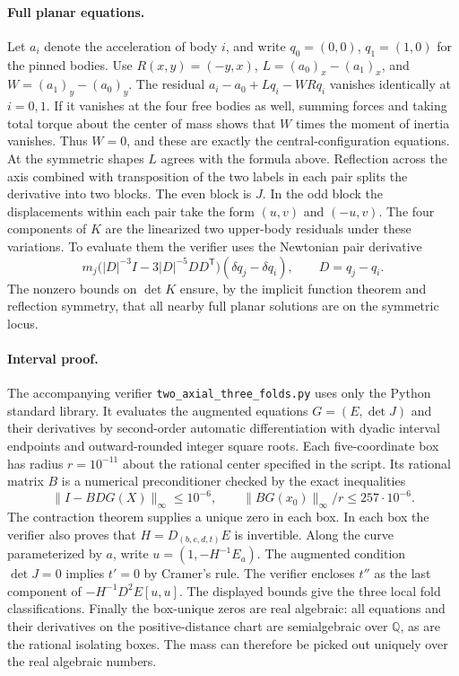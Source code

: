 \documentclass[11pt]{article}
\begin{document}
\paragraph{Full planar equations.}
Let $a_i$ denote the acceleration of body $i$, and write $q_0=(0,0)$,
$q_1=(1,0)$ for the pinned bodies. Use $R(x,y)=(-y,x)$,
$L=(a_0)_x-(a_1)_x$, and $W=(a_1)_y-(a_0)_y$. The residual
$a_i-a_0+Lq_i-WRq_i$ vanishes identically at $i=0,1$. If it vanishes
at the four free bodies as well, summing forces and taking total torque
about the center of mass shows that $W$ times the moment of inertia
vanishes. Thus $W=0$, and these are exactly the central-configuration
equations. At the symmetric shapes $L$ agrees with the formula above.
Reflection across the axis combined with transposition of the two labels
in each pair splits the derivative into two blocks. The even block is $J$.
In the odd block the displacements within each pair take the form
$(u,v)$ and $(-u,v)$. The four components of $K$ are the linearized
two upper-body residuals under these variations. To evaluate them the
verifier uses the Newtonian pair derivative
\[
 m_j\bigl(|D|^{-3}I-3|D|^{-5}DD^{\mathsf T}\bigr)
 (\delta q_j-\delta q_i),\qquad D=q_j-q_i.
\]
The nonzero bounds on $\det K$ ensure, by the implicit function theorem
and reflection symmetry, that all nearby full planar solutions are on
the symmetric locus.

\paragraph{Interval proof.}
The accompanying verifier \texttt{two\_axial\_three\_folds.py} uses only the
Python standard library. It evaluates the augmented equations
$G=(E,\det J)$ and their derivatives by second-order automatic
differentiation with dyadic interval endpoints and outward-rounded integer
square roots. Each five-coordinate box has radius $r=10^{-11}$ about the
rational center specified in the script. Its rational matrix $B$ is a
numerical preconditioner checked by the exact inequalities
\[
 \|I-BDG(X)\|_\infty\leq 10^{-6},\qquad
 \|BG(x_0)\|_\infty/r\leq 257\cdot10^{-6}.
\]
The contraction theorem supplies a unique zero in each box.
In each box the verifier also proves that
$H=D_{(b,c,d,t)}E$ is invertible. Along the curve parameterized by $a$,
write $u=(1,-H^{-1}E_a)$. The augmented condition $\det J=0$ implies $t'=0$
by Cramer's rule. The verifier encloses $t''$ as the last component of
$-H^{-1}D^2E[u,u]$. The displayed bounds give the three local fold
classifications. Finally the box-unique zeros are real algebraic:
all equations and their derivatives on the positive-distance chart are
semialgebraic over $\mathbb Q$, as are the rational isolating boxes.
The mass can therefore be picked out uniquely over the real algebraic
numbers.
\end{document}
